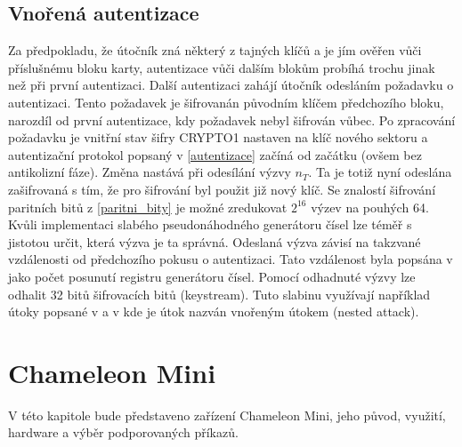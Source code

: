 \section{Vnořená autentizace}
Za předpokladu, že útočník zná některý z tajných klíčů a je jím ověřen vůči příslušnému bloku karty, autentizace vůči dalším blokům probíhá trochu jinak než při první autentizaci. Další autentizaci zahájí útočník odesláním požadavku o autentizaci. Tento požadavek je šifrovanán původním klíčem předchozího bloku, narozdíl od první autentizace, kdy požadavek nebyl šifrován vůbec. Po zpracování požadavku je vnitřní stav šifry CRYPTO1 nastaven na klíč nového sektoru a autentizační protokol popsaný v \ref{autentizace} začíná od začátku (ovšem bez antikolizní fáze). Změna nastává při odesílání výzvy $n_T$. Ta je totiž nyní odeslána zašifrovaná s tím, že pro šifrování byl použit již nový klíč. Se znalostí šifrování paritních bitů z \ref{paritni_bity} je možné zredukovat $2^{16}$ výzev na pouhých 64. Kvůli implementaci slabého pseudonáhodného generátoru čísel lze téměř s jistotou určit, která výzva je ta správná. Odeslaná výzva závisí na takzvané vzdálenosti od předchozího pokusu o autentizaci. Tato vzdálenost byla popsána v \cite{Dismantling_Mifare_Classic} jako počet posunutí registru generátoru čísel. Pomocí odhadnuté výzvy lze odhalit 32 bitů šifrovacích bitů (keystream)\cite{Dismantling_Mifare_Classic}.
Tuto slabinu využívají například útoky popsané v \cite{Cryptanalisis} a v \cite{Wirelessly_Pickpocketing} kde je útok nazván vnořeným útokem (nested attack).

\chapter{Chameleon Mini}
\label{chameleon_mini}
V této kapitole bude představeno zařízení Chameleon Mini, jeho původ, využití, hardware a výběr podporovaných příkazů.
\par

